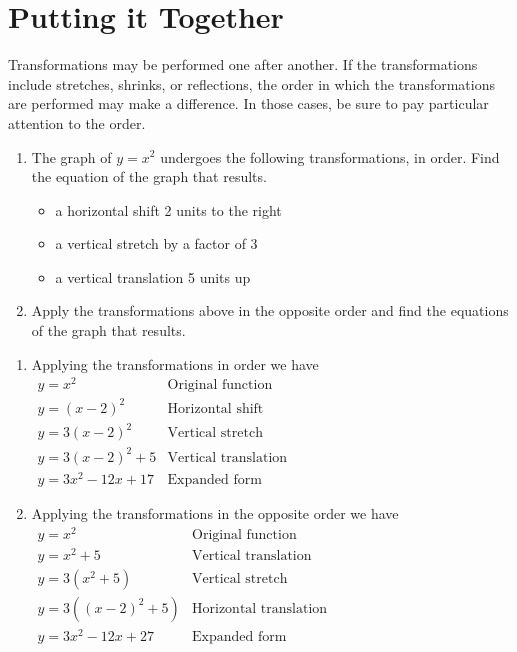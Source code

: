 \documentclass[handout, noauthor, nooutcomes]{ximera}
\begin{document}

\section{Putting it Together}
Transformations may be performed one after another. If the transformations include stretches, shrinks, or reflections, the order in which the transformations are performed may make a difference. In those cases, be sure to pay particular attention to the order.

\begin{example}
\begin{enumerate}
\item The graph of $y=x^2$ undergoes the following transformations, in order. Find the equation of the graph that results.
\begin{itemize}
\item a horizontal shift 2 units to the right
\item a vertical stretch by a factor of 3
\item a vertical translation 5 units up
\end{itemize}
\item Apply the transformations above in the opposite order and find the equations of the graph that results.
\end{enumerate}
\begin{explanation}
\begin{enumerate}
\item Applying the transformations in order we have\\
$
\begin{array}{lc}
y = x^2& \text{Original function}\\
y = (x-2)^2& \text{Horizontal shift} \\
y = 3(x-2)^2& \text{Vertical stretch} \\
y = 3(x-2)^2+5& \text{Vertical translation}\\
y = 3x^2 - 12x + 17& \text{Expanded form}
\end{array}
$
\item Applying the transformations in the opposite order we have\\
$
\begin{array}{lc}
y = x^2& \text{Original function}\\
y = x^2 + 5 & \text{Vertical translation} \\
y = 3(x^2+5)& \text{Vertical stretch} \\
y = 3((x-2)^2+5) & \text{Horizontal translation}\\
y = 3x^2 - 12x + 27& \text{Expanded form}
\end{array}
$
\end{enumerate}
\end{explanation}
\end{example}

%
\end{document}
